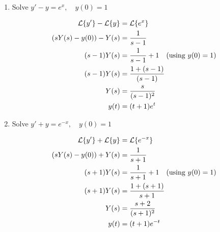 \documentclass[12pt]{article}
\begin{document}
\begin{enumerate}
\begin{enumerate}
    \item Solve \( y' - y = e^x, \quad y(0) = 1 \)

    \begin{align*}
        \mathcal{L} \{ y' \} - \mathcal{L} \{ y \} &= \mathcal{L} \{ e^x \} \\
        (sY(s) - y(0)) - Y(s) &= \frac{1}{s - 1} \\
        (s - 1) Y(s) &= \frac{1}{s - 1} + 1 \quad \text{(using \( y(0) = 1 \))} \\
        (s - 1) Y(s) &= \frac{1 + (s - 1)}{(s - 1)} \\
        Y(s) &= \frac{s}{(s - 1)^2} \\
        y(t) &= (t+1)e^t
    \end{align*}

    \item Solve \( y' + y = e^{-x}, \quad y(0) = 1 \)

    \begin{align*}
        \mathcal{L} \{ y' \} + \mathcal{L} \{ y \} &= \mathcal{L} \{ e^{-x} \} \\
        (sY(s) - y(0)) + Y(s) &= \frac{1}{s + 1} \\
        (s + 1) Y(s) &= \frac{1}{s + 1} + 1 \quad \text{(using \( y(0) = 1 \))} \\
        (s + 1) Y(s) &= \frac{1 + (s + 1)}{s + 1} \\
        Y(s) &= \frac{s + 2}{(s + 1)^2} \\
        y(t) &= (t+1)e^{-t}
    \end{align*}

\end{enumerate}

\end{enumerate}
\end{document}
